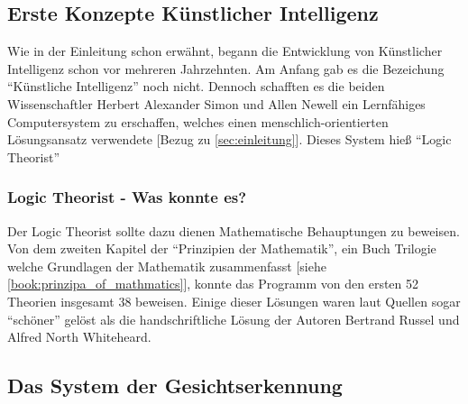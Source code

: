     \subsection{Erste Konzepte Künstlicher Intelligenz}
    \label{subsec:Theorie:Erste_Konzepte_von_KI}
        Wie in der Einleitung schon erwähnt, begann die Entwicklung von Künstlicher Intelligenz schon vor mehreren Jahrzehnten. Am Anfang gab es die Bezeichung \enquote{Künstliche Intelligenz} noch nicht. Dennoch schafften es die beiden Wissenschaftler Herbert Alexander Simon und Allen Newell ein Lernfähiges Computersystem zu erschaffen, welches einen menschlich-orientierten Lösungsansatz verwendete [Bezug zu \ref{sec:einleitung}]. Dieses System hieß \enquote{Logic Theorist}
        
        \subsubsection{Logic Theorist - Was konnte es?}
        \label{subsubsec:Logic_Theorist:Was_konnte_es}
            Der Logic Theorist sollte dazu dienen Mathematische Behauptungen zu beweisen. Von dem zweiten Kapitel der \enquote{Prinzipien der Mathematik}, ein Buch Trilogie welche Grundlagen der Mathematik zusammenfasst [siehe \ref{book:prinzipa_of_mathmatics}], konnte das Programm von den ersten 52 Theorien insgesamt 38 beweisen. Einige dieser Lösungen waren laut Quellen sogar \enquote{schöner} gelöst als die handschriftliche Lösung der Autoren Bertrand Russel und Alfred North Whiteheard.

    \subsection{Das System der Gesichtserkennung}
    \label{subsec:system_of_face_recognition}

